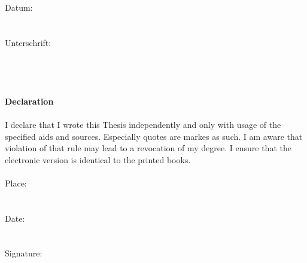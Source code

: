 \documentclass[a4paper,12pt]{report}
\begin{document}
Datum:\\\\\\

Unterschrift:\\\\\\\\\\

{\fontsize{20}{23}\selectfont\textbf{Declaration}}\\\\


I declare that I wrote this Thesis independently and only with usage of the specified aids and sources. Especially quotes are markes as such. I am aware that violation of that rule may lead to a revocation of my degree. I ensure that the electronic version is identical to the printed books.\\\\

Place:\\\\\\

Date:\\\\\\

Signature:
\vspace*{\fill}         %
\end{document}
